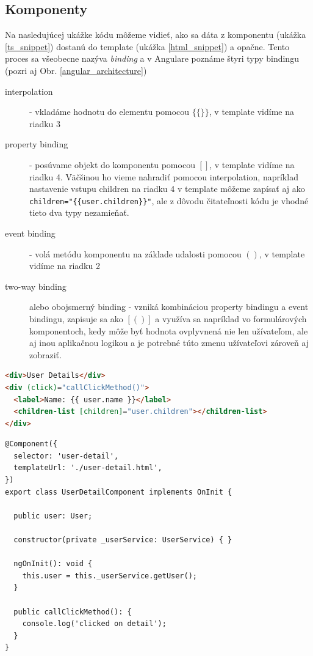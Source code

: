 \documentclass[
  digital, %
  twoside, %
  notable,   %
  nolof,   %
  nolot,   %
]{fithesis3}
\begin{document}
\subsection{Komponenty}
Na nasledujúcej ukážke kódu môžeme vidieť, ako sa dáta z komponentu (ukážka \ref{ts_snippet}) dostanú do template (ukážka \ref{html_snippet}) a opačne. Tento proces sa všeobecne nazýva \textit{binding} a v Angulare poznáme štyri typy bindingu (pozri aj Obr. \ref{angular_architecture})
\begin{description}
\item[interpolation] - vkladáme hodnotu do elementu pomocou $\{\{\}\}$, v template vidíme na riadku 3
\item[property binding] - posúvame objekt do komponentu pomocou $[ ]$, v template vidíme na riadku 4. Väčšinou ho vieme nahradiť pomocou interpolation, napríklad nastavenie vstupu children na riadku 4 v template môžeme zapísať aj ako\\
\texttt{children="\{\{user.children\}\}"}, ale z dôvodu čitateľnosti kódu je vhodné tieto dva typy nezamieňať.
\item[event binding] - volá metódu komponentu na základe udalosti pomocou $()$, v template vidíme na riadku 2
\item[two-way binding] alebo obojsmerný binding - vzniká kombináciou property bindingu a event bindingu, zapisuje sa ako $[( )]$ a využíva sa napríklad vo formulárových komponentoch, kedy môže byť hodnota ovplyvnená nie len užívateľom, ale aj inou aplikačnou logikou a je potrebné túto zmenu užívateľovi zároveň aj zobraziť.
\end{description}

\begin{lstlisting}[language=HTML,caption={HTML template \textit{user-detail.html}},captionpos=b,label=html_snippet]
<div>User Details</div>
<div (click)="callClickMethod()">
  <label>Name: {{ user.name }}</label>
  <children-list [children]="user.children"></children-list>
</div>
\end{lstlisting}

\begin{lstlisting}[caption={Komponent UserDetail},captionpos=b,label=ts_snippet]
@Component({
  selector: 'user-detail',
  templateUrl: './user-detail.html',
})
export class UserDetailComponent implements OnInit {

  public user: User;

  constructor(private _userService: UserService) { }

  ngOnInit(): void {
    this.user = this._userService.getUser();
  }
  
  public callClickMethod(): {
    console.log('clicked on detail');
  }
}
\end{lstlisting}
\end{document}
